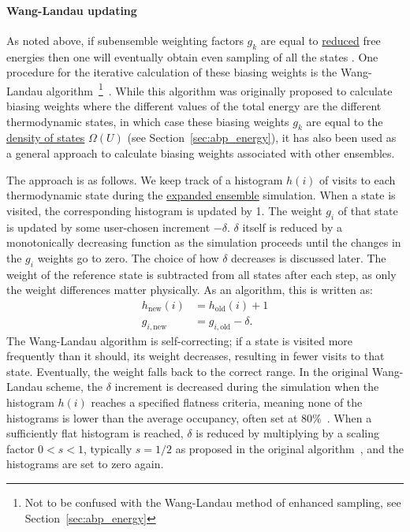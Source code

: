 \documentclass[9pt,review]{livecoms}
\begin{document}
\paragraph{Wang-Landau updating}
As noted above, if subensemble weighting factors $g_k$ are equal to \hyperlink{ref:reduced} {reduced} free energies then one will eventually obtain even sampling of all the states
\cite{lyubartsev:jcp:1992:expanded-ensembles}.  One procedure for the
iterative calculation of these biasing weights is the Wang-Landau
algorithm~\footnote{Not to be confused with the Wang-Landau method of enhanced sampling, see Section~\ref{sec:abp_energy}}~\cite{wang-landau:prl:2001:wang-landau}. While this algorithm was originally proposed to calculate biasing weights where the different values of the total energy are the different thermodynamic states, in which case these biasing weights $g_k$ are equal to the \hyperlink{ref:density_of_states} {density of states} $\Omega(U)$ (see Section~\ref{sec:abp_energy}), it has also been used as a general approach to calculate biasing weights associated with other ensembles.

The approach is as follows. We keep track of a histogram $h(i)$ of visits to each thermodynamic state during the \hyperlink{ref:ExpEns} {expanded ensemble} simulation.  When a state is visited, the corresponding
histogram is updated by 1.  The weight $g_i$ of that state is updated by some user-chosen increment $-\delta$.  $\delta$ itself is reduced by a monotonically decreasing function as the simulation proceeds until the changes in the $g_i$ weights go to zero. The choice of how $\delta$ decreases is discussed later. The
weight of the reference state is subtracted from all states after each step, as only the weight differences matter physically. As an algorithm, this is written as:
\begin{align}
h_{\mathrm{new}}(i) &= h_{\mathrm{old}}(i) + 1 \\
g_{i,\mathrm{new}} &= g_{i,\mathrm{old}} - \delta.
\label{eq:wang-landau}
\end{align}
The Wang-Landau algorithm is self-correcting; if a state is visited more frequently than it should, its weight decreases, resulting in fewer visits to that state.  Eventually, the weight falls back to the correct range.  In the original Wang-Landau scheme, the $\delta$ increment is decreased during the simulation when the histogram $h(i)$ reaches a specified flatness criteria, meaning none of the histograms is lower than the average occupancy, often set at 80\%~\cite{wang-landau:prl:2001:wang-landau}.  When a sufficiently flat histogram is reached, $\delta$ is reduced by multiplying by a scaling factor $0<s<1$, typically $s=1/2$ as proposed in the original algorithm~\cite{wang-landau:prl:2001:wang-landau}, and the histograms are set to zero again.
\end{document}
